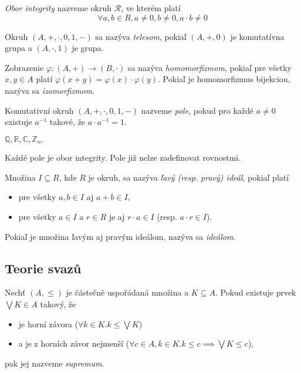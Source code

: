\begin{definition}
    {\em Obor integrity} nazveme okruh $\mathcal{R}$, ve kterém platí
    \[
        \forall a,b \in R, a \neq 0, b \neq 0, a \cdot b \neq 0
    \]
\end{definition}

\begin{definition}[Teleso]
    Okruh $(A, +, \cdot, 0, 1, -)$ sa nazýva {\em telesom}, pokiaľ
	$(A, +, 0)$ je komutatívna grupa a $(A, \cdot, 1)$ je grupa.
\end{definition}

\begin{definition}
    Zobrazenie $\varphi: (A,+) \to (B,\cdot)$ sa nazýva {\em homomorfizmom},
	pokiaľ pre všetky $x,y \in A$ platí $\varphi(x+y)=\varphi(x) \cdot \varphi(y)$.
	Pokiaľ je homomorfizmus bijekciou, nazýva sa {\em izomorfizmom}.
\end{definition}

\begin{definition}[Pole]
Komutativní okruh $(A, +, \cdot, 0, 1, -)$ nazveme {\em pole}, pokud
pro každé $a \neq 0$ existuje $a^{-1}$ takové, že $a \cdot a^{-1} = 1$.
\end{definition}

\begin{example}
    $\mathbb{Q}, \mathbb{R}, \mathbb{C}, \mathbb{Z}_n.$
\end{example}

Každé pole je obor integrity. Pole již nelze zadefinovat rovnostmi.

\begin{definition}[Ideál]
	Množina $I \subseteq R$, kde $R$ je okruh, sa nazýva 
	{\em ľavý (resp. pravý) ideál}, pokiaľ platí
	\begin{itemize}
		\item pre všetky $a,b \in I$ aj $a+b \in I$,
		\item pre všetky $a \in I$ a $r \in R$ je aj $r \cdot a \in I$ (resp. $a \cdot r \in I$).
	\end{itemize}
	Pokiaľ je množina ľavým aj pravým ideálom, nazýva sa {\em ideálom}.
\end{definition}

\subsection{Teorie svazů}

\begin{definition}[Supremum]
    Nechť $(A, \leq)$ je částečně uspořádaná množina
    a $K \subseteq A$. Pokud existuje prvek $\bigvee K \in A$ takový,
    že
    \begin{itemize}
        \item je horní závora ($\forall k \in K . k \leq \bigvee K$)
        \item a je z horních závor nejmenší
    ($\forall c \in A, k \in K . k \leq c \implies \bigvee K \leq c$),
    \end{itemize}
    pak jej nazveme {\em supremum}.
\end{definition}

